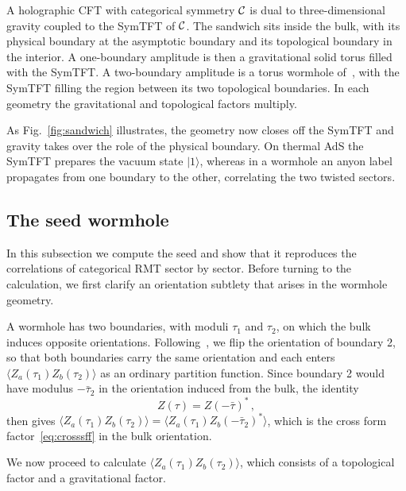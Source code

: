 \documentclass[11pt]{article}
\numberwithin{equation}{section}
\begin{document}
\begin{tcolorbox}[
  colback=gray!10,
  colframe=blue,
  boxrule=0.6pt,
  arc=2pt,
  left=6pt,
  right=6pt,
  top=4pt,
  bottom=4pt]
A holographic CFT with categorical symmetry $\mathcal C$ is dual to three-dimensional gravity coupled to the SymTFT of $\mathcal C$. The sandwich sits inside the bulk, with its physical boundary at the asymptotic boundary and its topological boundary in the interior. A one-boundary amplitude is then a gravitational solid torus filled with the SymTFT. A two-boundary amplitude is a torus wormhole of~\cite{Cotler:2020ugk}, with the SymTFT filling the region between its two topological boundaries. In each geometry the gravitational and topological factors multiply.
\end{tcolorbox}

As Fig.~\ref{fig:sandwich} illustrates, the geometry now closes off the SymTFT and gravity takes over the role of the physical boundary. On thermal AdS the SymTFT prepares the vacuum state $|1\rangle$, whereas in a wormhole an anyon label propagates from one boundary to the other, correlating the two twisted sectors.

\subsection{The seed wormhole}\label{sec:seed}

In this subsection we compute the seed and show that it reproduces the correlations of categorical RMT sector by sector. Before turning to the calculation, we first clarify an orientation subtlety that arises in the wormhole geometry.
 
A wormhole has two boundaries, with moduli $\tau_1$ and $\tau_2$, on which the bulk induces opposite orientations. Following~\cite{Cotler:2020ugk}, we flip the orientation of boundary 2, so that both boundaries carry the same orientation and each enters $\langle Z_a(\tau_1)Z_b(\tau_2)\rangle$ as an ordinary partition function. Since boundary 2 would have modulus $-\bar\tau_2$ in the orientation induced from the bulk, the identity
\begin{equation}\label{eq:conj}
Z(\tau)=Z(-\bar\tau)^*\,,
\end{equation}
then gives $\langle Z_a(\tau_1)Z_b(\tau_2)\rangle=\langle Z_a(\tau_1)Z_b(-\bar\tau_2)^*\rangle$, which is the cross form factor~\eqref{eq:crosssff} in the bulk orientation.

We now proceed to calculate  $\langle Z_a(\tau_1)Z_b(\tau_2)\rangle$, which consists of a topological factor and a gravitational factor.
\end{document}
